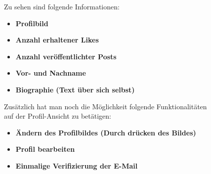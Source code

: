\begin{figure}[H]
\begin{minipage}{.6\textwidth}
\begin{changemargin}{0.5cm}{0cm}
            Zu sehen sind folgende Informationen:
            \begin{itemize}
                \item \textbf{Profilbild}
                \item \textbf{Anzahl erhaltener Likes}
                \item \textbf{Anzahl veröffentlichter Posts}
                \item \textbf{Vor- und Nachname}
                \item \textbf{Biographie (Text über sich selbst)}
            \end{itemize}

            Zusätzlich hat man noch die Möglichkeit folgende Funktionalitäten auf der Profil-Ansicht zu betätigen:
            \begin{itemize}
                \item \textbf{Ändern des Profilbildes (Durch drücken des Bildes)}
                \item \textbf{Profil bearbeiten}
                \item \textbf{Einmalige Verifizierung der E-Mail}
            \end{itemize}
        \end{changemargin}
    \end{minipage}
\end{figure}

